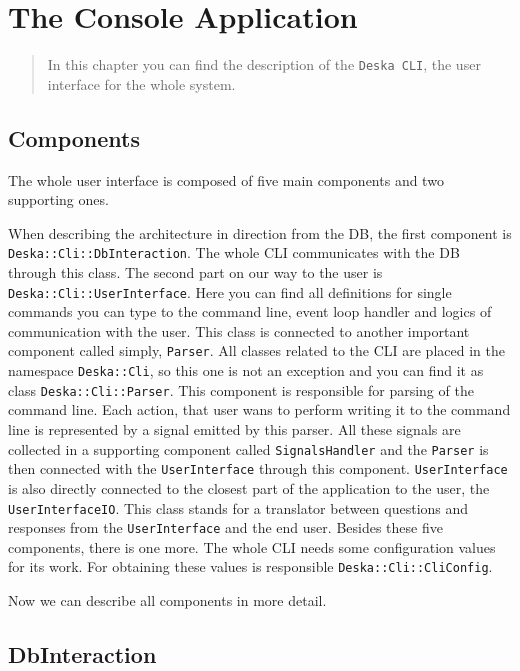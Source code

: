 \documentclass[deska]{subfiles}
\begin{document}
\chapter{The Console Application}
\label{sec:cli-app}

\begin{abstract}

In this chapter you can find the description of the {\tt Deska CLI}, the user interface for the whole system.

\end{abstract}

\section{Components}

The whole user interface is composed of five main components and two supporting ones.

When describing the architecture in direction from the DB, the first component is {\tt Deska::Cli::DbInteraction}. The 
whole CLI communicates with the DB through this class. The second part on our way to the user is {\tt Deska::Cli::UserInterface}.
Here you can find all definitions for single commands you can type to the command line, 
event loop handler and logics of communication with the user. This class is connected to another important component 
called simply, {\tt Parser}. All classes related to the CLI are placed in the namespace {\tt Deska::Cli}, so this one is not an 
exception and you can find it as class {\tt Deska::Cli::Parser}. This component is responsible for parsing of the 
command line. Each action, that user wans to perform writing it to the command line is represented by a signal emitted 
by this parser. All these signals are collected in a supporting component called {\tt SignalsHandler} and the {\tt Parser}
is then connected with the {\tt UserInterface} through this component. {\tt UserInterface} is also directly 
connected to the closest part of the application to the user, the {\tt UserInterfaceIO}. This class stands for a 
translator between questions and responses from the {\tt UserInterface} and the end user. Besides these five 
components, there is one more. The whole CLI needs some configuration values for its work. For obtaining these values 
is responsible {\tt Deska::Cli::CliConfig}.

Now we can describe all components in more detail.

\section{DbInteraction}
\end{document}
